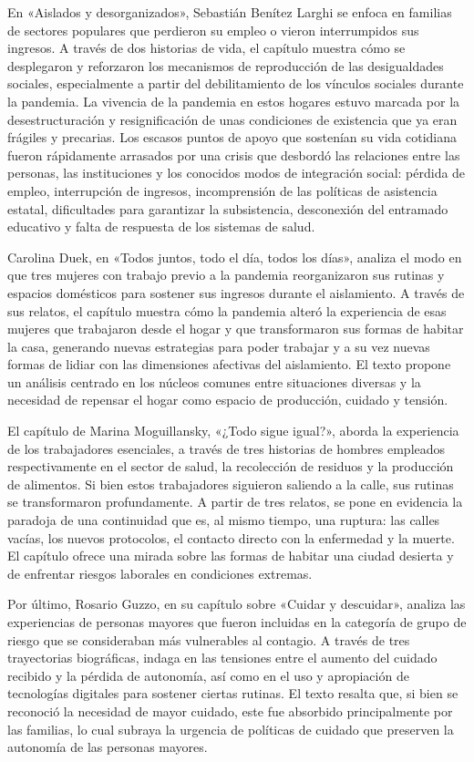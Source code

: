 En «Aislados y desorganizados», Sebastián Benítez Larghi se enfoca en familias de sectores populares que perdieron su empleo o vieron interrumpidos sus ingresos. A través de dos historias de vida, el capítulo muestra cómo se desplegaron y reforzaron los mecanismos de reproducción de las desigualdades sociales, especialmente a partir del debilitamiento de los vínculos sociales durante la pandemia. La vivencia de la pandemia en estos hogares estuvo marcada por la desestructuración y resignificación de unas condiciones de existencia que ya eran frágiles y precarias. Los escasos puntos de apoyo que sostenían su vida cotidiana fueron rápidamente arrasados por una crisis que desbordó las relaciones entre las personas, las instituciones y los conocidos modos de integración social: pérdida de empleo, interrupción de ingresos, incomprensión de las políticas de asistencia estatal, dificultades para garantizar la subsistencia, desconexión del entramado educativo y falta de respuesta de los sistemas de salud.

Carolina Duek, en «Todos juntos, todo el día, todos los días», analiza el modo en que tres mujeres con trabajo previo a la pandemia reorganizaron sus rutinas y espacios domésticos para sostener sus ingresos durante el aislamiento. A través de sus relatos, el capítulo muestra cómo la pandemia alteró la experiencia de esas mujeres que trabajaron desde el hogar y que transformaron sus formas de habitar la casa, generando nuevas estrategias para poder trabajar y a su vez nuevas formas de lidiar con las dimensiones afectivas del aislamiento. El texto propone un análisis centrado en los núcleos comunes entre situaciones diversas y la necesidad de repensar el hogar como espacio de producción, cuidado y tensión.

El capítulo de Marina Moguillansky, «¿Todo sigue igual?», aborda la experiencia de los trabajadores esenciales, a través de tres historias de hombres empleados respectivamente en el sector de salud, la recolección de residuos y la producción de alimentos. Si bien estos trabajadores siguieron saliendo a la calle, sus rutinas se transformaron profundamente. A partir de tres relatos, se pone en evidencia la paradoja de una continuidad que es, al mismo tiempo, una ruptura: las calles vacías, los nuevos protocolos, el contacto directo con la enfermedad y la muerte. El capítulo ofrece una mirada sobre las formas de habitar una ciudad desierta y de enfrentar riesgos laborales en condiciones extremas.

Por último, Rosario Guzzo, en su capítulo sobre «Cuidar y descuidar», analiza las experiencias de personas mayores que fueron incluidas en la categoría de grupo de riesgo que se consideraban más vulnerables al contagio. A través de tres trayectorias biográficas, indaga en las tensiones entre el aumento del cuidado recibido y la pérdida de autonomía, así como en el uso y apropiación de tecnologías digitales para sostener ciertas rutinas. El texto resalta que, si bien se reconoció la necesidad de mayor cuidado, este fue absorbido principalmente por las familias, lo cual subraya la urgencia de políticas de cuidado que preserven la autonomía de las personas mayores.

